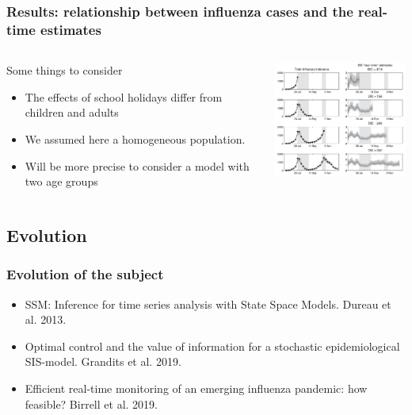 \documentclass{beamer}
\begin{document}
\begin{frame}
    \frametitle{Results: relationship between influenza cases and the real-time estimates}
    \begin{columns}
    \begin{column}{0.5\textwidth}
    Some things to consider
    \begin{itemize}
        \item The effects of school holidays differ from children and adults
        \item We assumed here a homogeneous population.
        \item Will be more precise to consider a model with two age groups
    \end{itemize}
    \end{column}
    \begin{column}{0.5\textwidth}
    \includegraphics[width=15em]{time-varying.png}
    \end{column}
    \end{columns}
\end{frame}

\subsection{Evolution}

\begin{frame}
    \frametitle{Evolution of the subject}
    \begin{itemize}
        \item SSM: Inference for time series analysis with State Space Models. Dureau et al. 2013.
        \item Optimal control and the value of information for a stochastic epidemiological SIS-model. Grandits et al. 2019.
        \item Efficient real-time monitoring of an emerging influenza pandemic: how feasible? Birrell et al. 2019.
    \end{itemize}
\end{frame}
\end{document}
